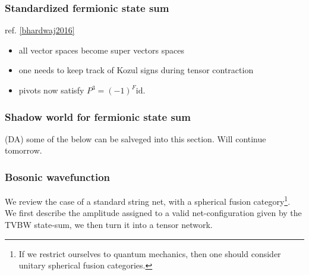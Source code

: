 \documentclass[12pt,a4paper]{article}
\newcommand{\dave}[1]{{\color{ao(english)}\footnotesize{(DA) #1}}}
\begin{document}
\subsubsection{Standardized fermionic state sum}
\label{standardized_fermionic_SS}
ref. \ref{bhardwaj2016}

\begin{itemize}
\item all vector spaces become super vectors spaces
\item one needs to keep track of Kozul signs during tensor contraction
\item pivots now satisfy $P^3 = (-1)^F \text{id}$.
\end{itemize}






\subsubsection{Shadow world for fermionic state sum}
\dave{some of the below can be salveged into this section.
Will continue tomorrow.}




\subsubsection{Bosonic wavefunction}
We review the case of a standard string net, with a spherical fusion category\footnote{If we restrict ourselves to quantum mechanics, then one should consider unitary spherical fusion categories.}. 
We first describe the amplitude assigned to a valid net-configuration given by the TVBW state-sum, 
we then turn it into a tensor network. 
\end{document}
